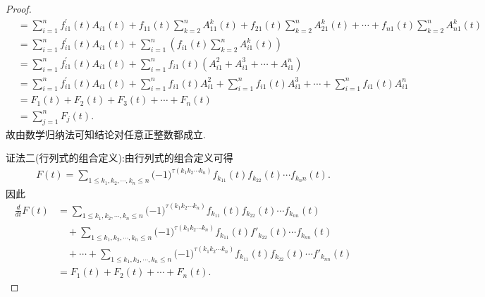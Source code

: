 \documentclass[lang=cn,newtx,10pt,scheme=chinese]{elegantbook}
\begin{document}
\begin{proof}
\begin{align*}
&=\sum_{i=1}^n{f_{i1}^{\prime}\left( t \right) A_{i1}\left( t \right)}+f_{11}\left( t \right) \sum_{k=2}^{n}{A_{11}^{k}(t)}+f_{21}\left( t \right) \sum_{k=2}^{n}{A_{21}^{k}(t)}+\cdots +f_{n1}\left( t \right) \sum_{k=2}^{n}{A_{n1}^{k}(t)}
\\
&=\sum_{i=1}^n{f_{i1}^{\prime}\left( t \right) A_{i1}\left( t \right)}+\sum_{i=1}^n{\left( f_{i1}\left( t \right) \sum_{k=2}^n{A_{i1}^{k}\left( t \right)} \right)}
\\
&=\sum_{i=1}^n{f_{i1}^{\prime}\left( t \right) A_{i1}\left( t \right)}+\sum_{i=1}^n{f_{i1}\left( t \right) \left( A_{i1}^{2}+A_{i1}^{3}+\cdots +A_{i1}^{n} \right)}
\\
&=\sum_{i=1}^n{f_{i1}^{\prime}\left( t \right) A_{i1}\left( t \right)}+\sum_{i=1}^n{f_{i1}\left( t \right) A_{i1}^{2}}+\sum_{i=1}^n{f_{i1}\left( t \right) A_{i1}^{3}}+\cdots +\sum_{i=1}^n{f_{i1}\left( t \right) A_{i1}^{n}}
\\
&=F_1\left( t \right) +F_2\left( t \right) +F_3\left( t \right) +\cdots +F_n\left( t \right) 
\\
&=\sum_{j=1}^n{F_j\left( t \right)}.
\end{align*}
故由数学归纳法可知结论对任意正整数都成立.

{\color{blue}证法二(行列式的组合定义):}由行列式的组合定义可得
\begin{align*}
    F(t)=\sum_{1\le k_1,k_2,\cdots ,k_n\le n}{(}-1)^{\tau (k_1k_2\cdots k_n)}f_{k_11}(t)f_{k_22}(t)\cdots f_{k_nn}(t).
\end{align*}
因此
\begin{align*}
    \frac{d}{dt}F(t)&=\sum_{1\le k_1,k_2,\cdots ,k_n\le n}{(}-1)^{\tau (k_1k_2\cdots k_n)}f_{k_{11}}(t)f_{k_{22}}(t)\cdots f_{k_{nn}}(t)
\\
&\quad+\sum_{1\le k_1,k_2,\cdots ,k_n\le n}{(}-1)^{\tau (k_1k_2\cdots k_n)}f_{k_{11}}(t)f\prime_{k_{22}}(t)\cdots f_{k_{nn}}(t)
\\
&\quad+\cdots +\sum_{1\le k_1,k_2,\cdots ,k_n\le n}{(}-1)^{\tau (k_1k_2\cdots k_n)}f_{k_{11}}(t)f_{k_{22}}(t)\cdots f\prime_{k_{nn}}(t)
\\
&=F_1(t)+F_2(t)+\cdots +F_n(t).
\end{align*}
\end{proof}
\end{document}
